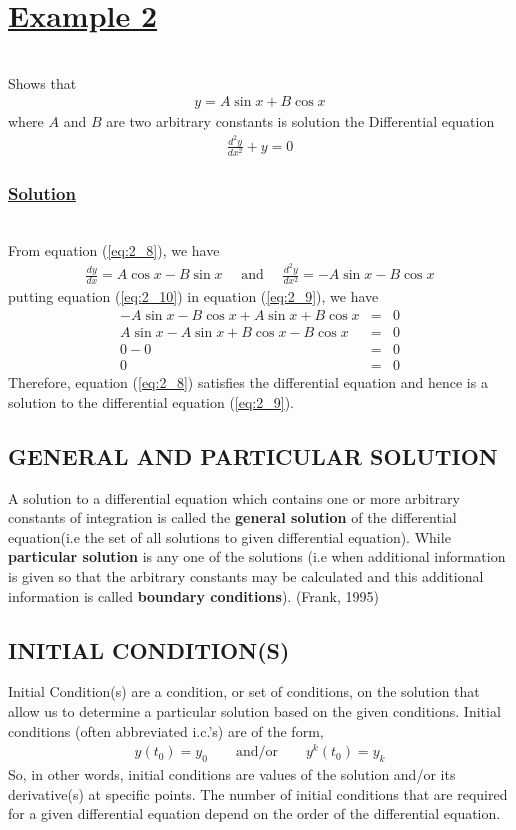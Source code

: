 \documentclass[11pt]{report}
\newcommand{\ubt}[1]{\textbf{\underline{#1}}}
\newcommand{\sps}{\\[0.2cm]}
\newcommand{\spn}[1]{\\[#1cm]}
\newcommand{\refn}[1]{(\ref{#1})}
\newcommand{\refx}[1]{\refn{eq:#1}}
\newcommand{\bt}[1]{\textbf{#1}}
\newcommand{\example}[1]{\section*{\ubt{Example #1}}{~}\spn{-1}}
\newcommand{\solution}{\subsubsection{\ubt{Solution}}{~}\spn{-1}}
\begin{document}
	\example{2}
	Shows that
	\begin{eqnarray}
		y=A\sin x +B\cos x \label{eq:2_8}
	\end{eqnarray}
	where $A$ and $B$ are two arbitrary constants is solution the Differential equation
	\begin{eqnarray}
		\frac{d^2y}{dx^2} + y = 0\label{eq:2_9}
	\end{eqnarray}
	
	\solution
	From equation \refx{2_8}, we have
	\begin{eqnarray}
		\frac{dy}{dx} = A\cos x - B\sin x\quad \text{ and } \quad \frac{d^2y}{dx^2} = -A\sin x - B\cos x \label{eq:2_10}
	\end{eqnarray}
	putting equation \refx{2_10} in equation \refx{2_9}, we have
	\begin{eqnarray*}
		-A\sin x - B\cos x + A\sin x + B\cos x &=& 0\sps
		A\sin x - A\sin x + B\cos x - B\cos x &=& 0\sps
		0 - 0 &=& 0 \sps
		0 &=& 0
	\end{eqnarray*}
	Therefore, equation \refx{2_8} satisfies the differential equation and hence is a solution to the differential equation \refx{2_9}.

	\subsection{GENERAL AND PARTICULAR SOLUTION}
	A solution to a differential equation which contains one or more arbitrary constants of integration is called the \bt{general solution} of the differential equation(i.e the set of all solutions to given differential equation). While \bt{particular solution} is any one of the solutions (i.e when additional information is given so that the arbitrary constants may be calculated and this additional information is called \bt{boundary conditions}). (Frank, 1995)
	
	\subsection{INITIAL CONDITION(S)}
	Initial Condition(s) are a condition, or set of conditions, on the solution that allow us to determine a particular solution based on the given conditions. Initial conditions (often abbreviated i.c.’s) are of the form,
	\begin{eqnarray}
		y(t_0) = y_0 \qquad \text{and/or} \qquad y^{k}(t_0) = y_k
	\end{eqnarray}
	So, in other words, initial conditions are values of the solution and/or its derivative(s) at specific points. The number of initial conditions that are required for a given differential equation depend on the order of the differential equation. 
	
\end{document}
